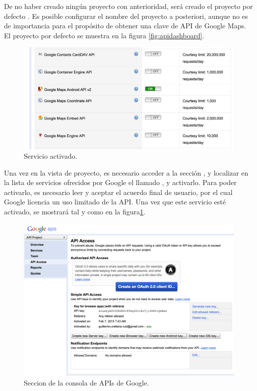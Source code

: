 De no haber creado ningún proyecto con anterioridad, será creado el proyecto por defecto . Es posible configurar el nombre del proyecto a posteriori, aunque no es de importancia para el propósito de obtener una clave de API de Google Maps. El proyecto por defecto se muestra en la figura \ref{fig:apidashboard}.

 \begin{figure}[H] \centering
    \includegraphics[width=15cm]{graphs/apion.png} \caption{Servicio  activado.}\label{fig:apion}
\end{figure}

Una vez en la vista de proyecto, es necesario acceder a la sección , y localizar en la lista de servicios ofrecidos por Google el llamado , y activarlo. Para poder activarlo, es necesario leer y aceptar el acuerdo final de usuario, por el cual Google licencia un uso limitado de la API. Una vez que este servicio esté activado, se mostrará tal y como en la figura\ref{fig:apion}.

 \begin{figure}[H] \centering
    \includegraphics[width=15cm]{graphs/apikey.png} \caption{Seccion  de la consola de APIs de Google.}\label{fig:apikey}
\end{figure}

